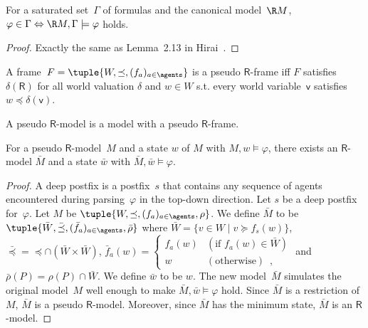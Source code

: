 \documentclass[doctor]{iscs-thesis}
\begin{document}
\begin{proposition}
 \label{X}
 For a saturated set~$\Gamma$ of formulas and the canonical model~$\R
 M$,
 $\varphi\in\Gamma\Leftrightarrow \R M,\Gamma\models\varphi$ holds.
\end{proposition}
\begin{proof}
 Exactly the same as Lemma~2.13 in Hirai~\cite{lpar-hirai}.
\end{proof}

\begin{definition}
 A frame~$F = \tuple{W,\preceq, (f_a)_{a\in\agents}}$
 is a pseudo $\mathsf R$-frame iff $F$ satisfies
 $\delta(\mathsf R)$ for all world valuation
 $\delta$ and $w\in W$ s.t.
 every world variable~$\mathsf v$ satisfies
 $w\preceq \delta(\mathsf v)$.
\end{definition}
 A pseudo $\mathsf R$-model is a model with a pseudo $\mathsf R$-frame.

\begin{lemma}
 \label{pseudo-real}
 For a pseudo $\mathsf R$-model~$M$ and a state $w$ of $M$ with
 $M,w\models\varphi$,
 there exists an $\mathsf R$-model $\bar M$ and a state $\bar w$
 with $\bar M,\bar w\models\varphi$.
\end{lemma}
\begin{proof}
 A deep postfix is a postfix~$s$ that contains any sequence of agents
 encountered during parsing~$\varphi$ in the top-down direction.
 Let $s$ be a deep postfix for~$\varphi$. Let $M$ be
 $\tuple{W,\preceq,(f_a)_{a\in\agents},\rho}$.
 We define $\bar M$ to be $\tuple{\bar W,\bar\preceq,
 (\bar f_a)_{a\in\agents},\bar \rho}$ where
 $\bar W=\{v\in W\mid v\succeq f_s(w)\}$,$\bar\preceq =
 \preceq\cap (\bar W\times\bar W)$,
 $\bar f_a(w)= \begin{cases}
		    f_a(w)&(\mbox{if }f_a(w)\in\bar W)\\
		    w&(\mbox{otherwise})\enspace,
		   \end{cases}$
 and $\bar \rho(P) =\rho(P)\cap\bar W$.
 We define $\bar w$ to be $w$.
 The new model~$\bar M$ simulates the original model~$M$ well enough
 to make $\bar M,\bar w\models\varphi$ hold.
 Since $\bar M$ is a restriction of $M$, $\bar M$ is a pseudo
 $\mathsf R$-model.
 Moreover, since $\bar M$ has the minimum state, $\bar M$ is an
 $\mathsf R$-model.
\end{proof}
\end{document}
